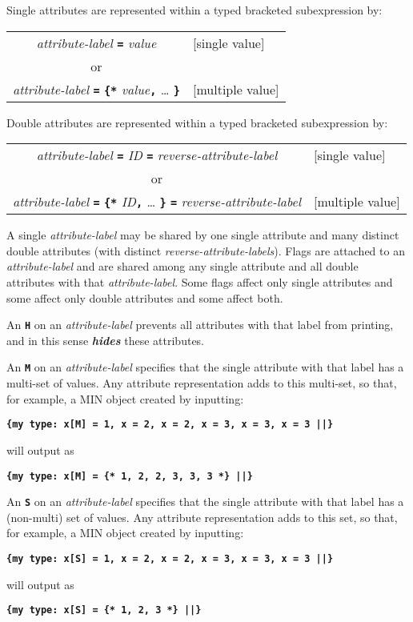 \documentclass[12pt]{article}
\makeatletter
\newcommand{\TT}[1]{{\tt \bfseries #1}}
\newcommand{\skey}[2]{{\bf \em #1#2}\index{#1}}
\newcommand{\ttkey}[1]{\TT{#1}\index{#1@\TT{#1}}}
\makeatother
\begin{document}
Single attributes are represented within a typed bracketed subexpression
by:
\begin{center}
\begin{tabular}{cl}
{\em attribute-label} \TT{=} {\em value} & [single value]\\
or \\
{\em attribute-label} \TT{=} \TT{\{*} {\em value}\TT{,} \ldots{} \TT{*\}}
    & [multiple value] \\
\end{tabular}
\end{center}
Double attributes are represented within a typed bracketed subexpression
by:
\begin{center}
\begin{tabular}{cl}
{\em attribute-label} \TT{=} {\em ID}
    \TT{=} {\em reverse-attribute-label} & [single value] \\
or \\
{\em attribute-label} \TT{=} \TT{\{*} {\em ID}\TT{,} \ldots{} \TT{*\}}
    \TT{=} {\em reverse-attribute-label} & [multiple value] \\
\end{tabular}
\end{center}

A single {\em attribute-label} may be shared by one single attribute
and many distinct double attributes
(with distinct {\em reverse-attribute-labels}).  Flags are attached to an {\em attribute-label} and are shared
among any single attribute and all double attributes with
that {\em attribute-label}.  Some flags affect only single attributes
and some affect only double attributes and some affect both.

An \ttkey{H} on an {\em attribute-label} prevents all attributes
with that label from printing, and in this sense \skey{hide}s these
attributes.

An \ttkey{M} on an {\em attribute-label} specifies that
the single attribute with that label has a multi-set of values.  Any
attribute representation adds to this multi-set, so that, for example,
a MIN object created by inputting:
\begin{center}
\TT{\{my type: x[M] = 1, x = 2, x = 2, x = 3, x = 3, x = 3 ||\}}
\end{center}
will output as
\begin{center}
\TT{\{my type: x[M] = \{* 1, 2, 2, 3, 3, 3 *\} ||\}}
\end{center}

An \ttkey{S} on an {\em attribute-label} specifies that
the single attribute with that label has a (non-multi) set of values.  Any
attribute representation adds to this set, so that, for example,
a MIN object created by inputting:
\begin{center}
\TT{\{my type: x[S] = 1, x = 2, x = 2, x = 3, x = 3, x = 3 ||\}}
\end{center}
will output as
\begin{center}
\TT{\{my type: x[S] = \{* 1, 2, 3 *\} ||\}}
\end{center}
\end{document}
